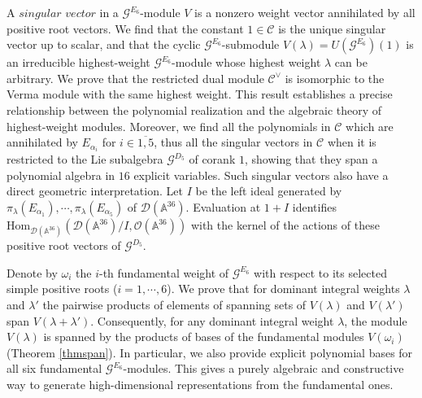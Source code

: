 \documentclass[12pt]{article}
\numberwithin{equation}{section}
\theoremstyle{definition}
\theoremstyle{remark}
\begin{document}
A $singular$ $vector$ in a $\mathscr{G}^{E_6}$-module $V$ is a nonzero weight vector annihilated by all positive root vectors. We find that the constant $1\in\mathscr{C}$ is the unique singular vector up to scalar, and that the cyclic $\mathscr{G}^{E_6}$-submodule $V(\lambda)=U(\mathscr{G}^{E_6})(1)$ is an irreducible highest-weight $\mathscr{G}^{E_6}$-module whose highest weight $\lambda$ can be arbitrary. We prove that the restricted dual module $\mathscr{C}^{\vee}$ is isomorphic to the Verma module with the same highest weight. This result establishes a precise relationship between the polynomial realization and the algebraic theory of highest-weight modules. Moreover, we find all the polynomials in $\mathscr{C}$ which are annihilated by $E_{\alpha_i}$ for $i\in\overline{1,5}$, thus all the singular vectors in $\mathscr{C}$ when it is restricted to the Lie subalgebra $\mathscr{G}^{D_5}$ of corank $1$, showing that they span a polynomial algebra in $16$ explicit variables. Such singular vectors also have a direct geometric interpretation. Let $I$ be the left ideal generated by $\pi_{\lambda}(E_{\alpha_1}),\cdots,\pi_{\lambda}(E_{\alpha_5})$ of $\mathscr D(\mathbb{A}^{36})$. Evaluation at $1+I$ identifies $\mathrm{Hom}_{\mathscr D(\mathbb{A}^{36})}(\mathscr D(\mathbb{A}^{36})/I,\mathscr{O}(\mathbb{A}^{36}))$ with the kernel of the actions of these positive root vectors of $\mathscr{G}^{D_5}$.

Denote by $\omega_i$ the $i$-th fundamental weight of $\mathscr{G}^{E_6}$ with respect to its selected simple positive roots ($i=1,\cdots,6$). We prove that for dominant integral weights $\lambda$ and $\lambda'$ the pairwise products of elements of spanning sets of $V(\lambda)$ and $V(\lambda')$ span $V(\lambda+\lambda')$. Consequently, for any dominant integral weight $\lambda$, the module $V(\lambda)$ is spanned by the products of bases of the fundamental modules $V(\omega_i)$ (Theorem \ref{thmspan}). In particular, we also provide explicit polynomial bases for all six fundamental $\mathscr{G}^{E_6}$-modules. This gives a purely algebraic and constructive way to generate high-dimensional representations from the fundamental ones.
\end{document}
